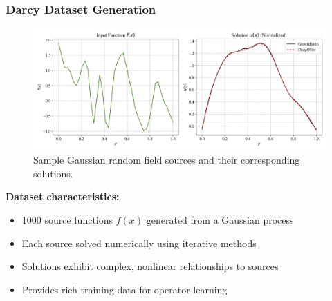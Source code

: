 \documentclass[notes]{beamer}
\begin{document}
\begin{frame}
\frametitle{Darcy Dataset Generation}

\begin{figure}[ht]
	\centering
	\includegraphics[width=\textwidth]{figs/darcy_samples.png}
	\caption*{Sample Gaussian random field sources and their corresponding solutions.}
\end{figure}

\textbf{Dataset characteristics:}
\begin{itemize}
    \item 1000 source functions $f(x)$ generated from a Gaussian process
    \item Each source solved numerically using iterative methods
    \item Solutions exhibit complex, nonlinear relationships to sources
    \item Provides rich training data for operator learning
\end{itemize}

\end{frame}
\end{document}
